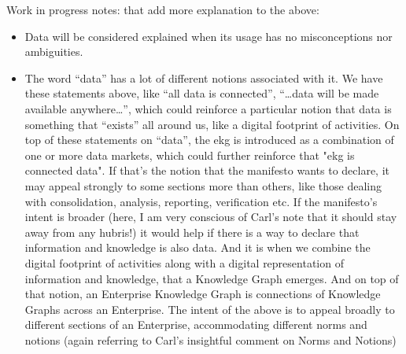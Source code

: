 Work in progress notes: that add more explanation to the above:

\begin{itemize}
    \item Data will be considered explained when its usage has no misconceptions nor ambiguities.
    \item The word “data” has a lot of different notions associated with it.
    We have these statements above, like “all data is connected”, “…data will be made available anywhere…”,
    which could reinforce a particular notion that data is something that “exists” all around us,
    like a digital footprint of activities.
    On top of these statements on “data”, the \gls{ekg} is introduced as a combination of one or more data markets,
    which could further reinforce that "\gls{ekg} is connected data".
    If that’s the notion that the manifesto wants to declare, it may appeal strongly to some sections more than others,
    like those dealing with consolidation, analysis, reporting, verification etc.
    If the manifesto’s intent is broader (here, I am very conscious of Carl’s note that it should stay away
    from any hubris!) it would help if there is a way to declare that information and knowledge is also data.
    And it is when we combine the digital footprint of activities along with a digital representation of
    information and knowledge, that a Knowledge Graph emerges.
    And on top of that notion, an Enterprise Knowledge Graph is connections of Knowledge Graphs across an Enterprise.
    The intent of the above is to appeal broadly to different sections of an Enterprise,
    accommodating different norms and notions (again referring to Carl’s insightful comment on Norms and Notions)

\end{itemize}

